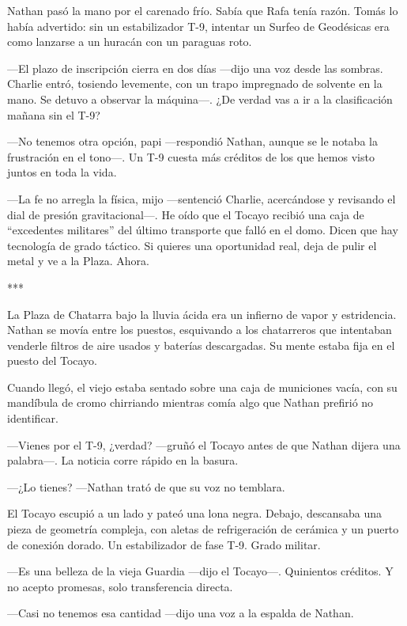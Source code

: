 \documentclass[11pt,twoside]{book}
\begin{document}
Nathan pasó la mano por el carenado frío. Sabía que Rafa tenía razón. Tomás lo había advertido: sin un estabilizador T-9, intentar un Surfeo de Geodésicas era como lanzarse a un huracán con un paraguas roto.

---El plazo de inscripción cierra en dos días ---dijo una voz desde las sombras. Charlie entró, tosiendo levemente, con un trapo impregnado de solvente en la mano. Se detuvo a observar la máquina---. ¿De verdad vas a ir a la clasificación mañana sin el T-9?

---No tenemos otra opción, papi ---respondió Nathan, aunque se le notaba la frustración en el tono---. Un T-9 cuesta más créditos de los que hemos visto juntos en toda la vida.

---La fe no arregla la física, mijo ---sentenció Charlie, acercándose y revisando el dial de presión gravitacional---. He oído que el Tocayo recibió una caja de ``excedentes militares'' del último transporte que falló en el domo. Dicen que hay tecnología de grado táctico. Si quieres una oportunidad real, deja de pulir el metal y ve a la Plaza. Ahora.

\bigskip
\begin{center}***\end{center}
\bigskip

La Plaza de Chatarra bajo la lluvia ácida era un infierno de vapor y estridencia. Nathan se movía entre los puestos, esquivando a los chatarreros que intentaban venderle filtros de aire usados y baterías descargadas. Su mente estaba fija en el puesto del Tocayo.

Cuando llegó, el viejo estaba sentado sobre una caja de municiones vacía, con su mandíbula de cromo chirriando mientras comía algo que Nathan prefirió no identificar.

---Vienes por el T-9, ¿verdad? ---gruñó el Tocayo antes de que Nathan dijera una palabra---. La noticia corre rápido en la basura.

---¿Lo tienes? ---Nathan trató de que su voz no temblara.

El Tocayo escupió a un lado y pateó una lona negra. Debajo, descansaba una pieza de geometría compleja, con aletas de refrigeración de cerámica y un puerto de conexión dorado. Un estabilizador de fase T-9. Grado militar.

---Es una belleza de la vieja Guardia ---dijo el Tocayo---. Quinientos créditos. Y no acepto promesas, solo transferencia directa.

---Casi no tenemos esa cantidad ---dijo una voz a la espalda de Nathan.
\end{document}
